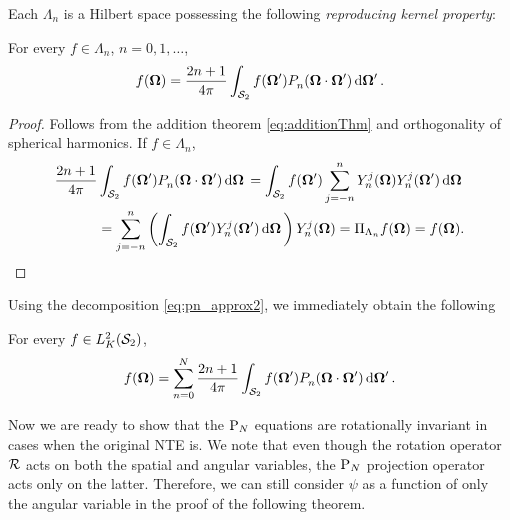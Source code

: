 Each $\Lambda_n$ is a Hilbert space possessing the following \textit{reproducing kernel property}:
\begin{lemma}
	For every $f \in \Lambda_n$, $n = 0,1,\ldots$, 
	$$
		f(\bomega) = \frac{2n+1}{4\pi} \intA[']{f(\bomega')\P{n}{}(\bomega\cdot\bomega')}.
	$$
\end{lemma}
\begin{proof}
	Follows from the addition theorem \eqref{eq:additionThm} and orthogonality of spherical harmonics. If $f \in
	\Lambda_n$,
	$$
		\begin{aligned}
			\frac{2n+1}{4\pi}&\intA{f(\bomega')\P{n}{}(\bomega\cdot\bomega')} = 
			\intA{f(\bomega')\sum_{j=-n}^{n}\Y{n}{j}(\bomega)\Y{n}{j}(\bomega')} \\
			&= \sum_{j=-n}^{n}\left(\intA{f(\bomega')\Y{n}{j}(\bomega')}\right)\Y{n}{j}(\bomega) =
			\Projop[\Lambda_n]f(\bomega) = f(\bomega).
		\end{aligned}
	$$
\end{proof}
\noindent Using the decomposition \eqref{eq:pn_approx2}, we immediately obtain the following
\begin{corollary}\label{cor:repker}
	For every $f\in\Lp[2]_K(\Sphere)$,
	\begin{equation}\label{eq:repker}
		f(\bomega) = \sum_{n=0}^{N} \frac{2n+1}{4\pi} \intA[']{f(\bomega')\P{n}{}(\bomega\cdot\bomega')}.
	\end{equation} 
\end{corollary}
%
\noindent Now we are ready to show that the $\PN$ equations are rotationally
invariant in cases when the original NTE is. We note that even though the rotation operator $\genop{R}$ acts on both the
spatial and angular variables, the $\PN$ projection operator acts only on the latter. Therefore, we can still consider
$\psi$ as a function of only the angular variable in the proof of the following theorem.

